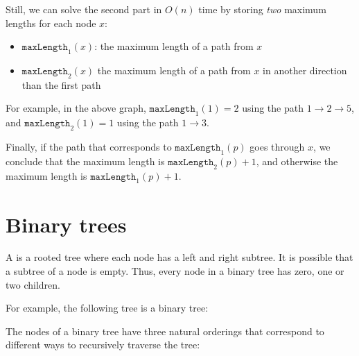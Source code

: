 Still, we can solve the second part in
$O(n)$ time by storing \emph{two} maximum lengths
for each node $x$:
\begin{itemize}
\item $\texttt{maxLength}_1(x)$:
the maximum length of a path from $x$
\item $\texttt{maxLength}_2(x)$
the maximum length of a path from $x$
in another direction than the first path
\end{itemize}
For example, in the above graph,
$\texttt{maxLength}_1(1)=2$
using the path $1 \rightarrow 2 \rightarrow 5$,
and $\texttt{maxLength}_2(1)=1$
using the path $1 \rightarrow 3$.

Finally, if the path that corresponds to
$\texttt{maxLength}_1(p)$ goes through $x$,
we conclude that the maximum length is
$\texttt{maxLength}_2(p)+1$,
and otherwise the maximum length is
$\texttt{maxLength}_1(p)+1$.


\section{Binary trees}


\begin{samepage}
A  is a rooted tree
where each node has a left and right subtree.
It is possible that a subtree of a node is empty.
Thus, every node in a binary tree has
zero, one or two children.

For example, the following tree is a binary tree:
\begin{center}
\end{center}
\end{samepage}


The nodes of a binary tree have three natural
orderings that correspond to different ways to 
recursively traverse the tree:

